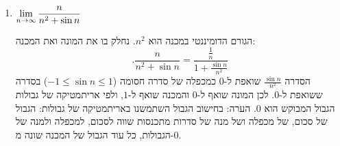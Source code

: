 \begin{enumerate}
\begin{solbox}
    מכיוון ש-
    $$,\lim_{n\to\infty}\frac{n}{n^2+1}=\lim_{n\to\infty}\frac{1}{n+1}=0$$
    נסיק, ע"י שימוש בכלל הסנדוויץ', כי
    $a_n\goes 0$.
הערה: בחישוב הגבול השתמשנו באריתמטיקה של גבולות: הגבול של סכום, של מכפלה ושל מנה של סדרות מתכנסות שווה לסכום, למכפלה ולמנה של הגבולות, כל עוד הגבול של המכנה שונה מ-$0$.
\end{solbox}
    \item $\displaystyle{\lim_{n\to\infty}\frac{n}{n^2+\sin n}}$
\begin{solbox}
הגורם הדומיננטי במכנה הוא $n^2$. נחלק בו את המונה ואת המכנה:
$$.\frac{n}{n^2+\sin n}=\frac{\frac1n}{1+\frac{\sin n}{n^2}}$$
הסדרה $\frac{\sin n}{n^2}$ שואפת ל-$0$ כמכפלה של סדרה חסומה ($-1\le\sin n\le1$) בסדרה ששואפת ל-$0$. לכן המונה שואף ל-$0$ והמכנה שואף ל-$1$, ולפי אריתמטיקה של גבולות הגבול המבוקש הוא
    $0$.
הערה: בחישוב הגבול השתמשנו באריתמטיקה של גבולות: הגבול של סכום, של מכפלה ושל מנה של סדרות מתכנסות שווה לסכום, למכפלה ולמנה של הגבולות, כל עוד הגבול של המכנה שונה מ-$0$.
\end{solbox}

\eMs
\end{enumerate}
